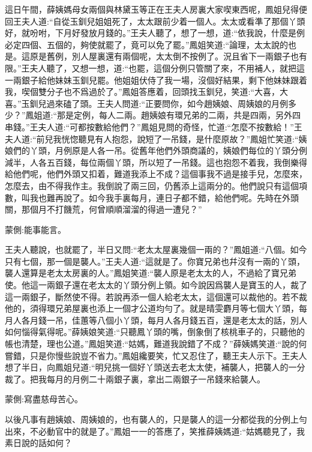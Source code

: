 \begin{parag}
    這日午間，薛姨媽母女兩個與林黛玉等正在王夫人房裏大家喫東西呢，鳳姐兒得便回王夫人道:“自從玉釧兒姐姐死了，太太跟前少着一個人。太太或看準了那個丫頭好，就吩咐，下月好發放月錢的。”王夫人聽了，想了一想，道:“依我說，什麼是例必定四個、五個的，夠使就罷了，竟可以免了罷。”鳳姐笑道:“論理，太太說的也是。這原是舊例，別人屋裏還有兩個呢，太太倒不按例了。況且省下一兩銀子也有限。”王夫人聽了，又想一想，道:“也罷，這個分例只管關了來，不用補人，就把這一兩銀子給他妹妹玉釧兒罷。他姐姐伏侍了我一場，沒個好結果，剩下他妹妹跟着我，喫個雙分子也不爲過於了。”鳳姐答應着，回頭找玉釧兒，笑道:“大喜，大喜。”玉釧兒過來磕了頭。王夫人問道:“正要問你，如今趙姨娘、周姨娘的月例多少？”鳳姐道:“那是定例，每人二兩。趙姨娘有環兄弟的二兩，共是四兩，另外四串錢。”王夫人道:“可都按數給他們？”鳳姐見問的奇怪，忙道:“怎麼不按數給！”王夫人道:“前兒我恍惚聽見有人抱怨，說短了一吊錢，是什麼原故？”鳳姐忙笑道:“姨娘們的丫頭，月例原是人各一吊。從舊年他們外頭商議的，姨娘們每位的丫頭分例減半，人各五百錢，每位兩個丫頭，所以短了一吊錢。這也抱怨不着我，我倒樂得給他們呢，他們外頭又扣着，難道我添上不成？這個事我不過是接手兒，怎麼來，怎麼去，由不得我作主。我倒說了兩三回，仍舊添上這兩分的。他們說只有這個項數，叫我也難再說了。如今我手裏每月，連日子都不錯，給他們呢。先時在外頭關，那個月不打饑荒，何曾順順溜溜的得過一遭兒？”\begin{note}蒙側:能事能言。\end{note}王夫人聽說，也就罷了，半日又問:“老太太屋裏幾個一兩的？”鳳姐道:“八個。如今只有七個，那一個是襲人。”王夫人道:“這就是了。你寶兄弟也幷沒有一兩的丫頭，襲人還算是老太太房裏的人。”鳳姐笑道:“襲人原是老太太的人，不過給了寶兄弟使。他這一兩銀子還在老太太的丫頭分例上領。如今說因爲襲人是寶玉的人，裁了這一兩銀子，斷然使不得。若說再添一個人給老太太，這個還可以裁他的。若不裁他的，須得環兄弟屋裏也添上一個才公道均勻了。就是晴雯麝月等七個大丫頭，每月人各月錢一吊，佳蕙等八個小丫頭，每月人各月錢五百，還是老太太的話，別人如何惱得氣得呢。”薛姨娘笑道:“只聽鳳丫頭的嘴，倒象倒了核桃車子的，只聽他的帳也清楚，理也公道。”鳳姐笑道:“姑媽，難道我說錯了不成？”薛姨媽笑道:“說的何嘗錯，只是你慢些說豈不省力。”鳳姐纔要笑，忙又忍住了，聽王夫人示下。王夫人想了半日，向鳳姐兒道:“明兒挑一個好丫頭送去老太太使，補襲人，把襲人的一分裁了。把我每月的月例二十兩銀子裏，拿出二兩銀子一吊錢來給襲人。\begin{note}蒙側:寫盡慈母苦心。\end{note}以後凡事有趙姨娘、周姨娘的，也有襲人的，只是襲人的這一分都從我的分例上勻出來，不必動官中的就是了。”鳳姐一一的答應了，笑推薛姨媽道:“姑媽聽見了，我素日說的話如何？
\end{parag}
